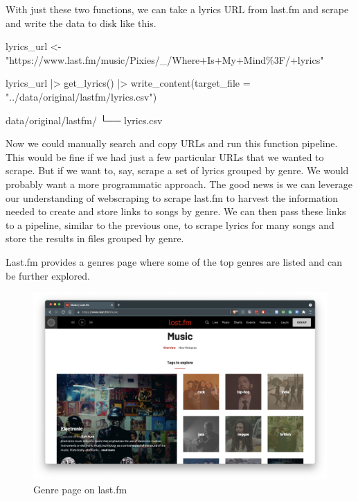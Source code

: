 \documentclass[
  letterpaper,
]{scrbook}
\newenvironment{Shaded}{\begin{snugshade}}{\end{snugshade}}
\newcommand{\AttributeTok}[1]{\textcolor[rgb]{0.00,0.00,0.00}{#1}}
\newcommand{\ExtensionTok}[1]{\textcolor[rgb]{0.00,0.00,0.00}{#1}}
\newcommand{\FunctionTok}[1]{\textcolor[rgb]{0.00,0.00,0.00}{#1}}
\newcommand{\NormalTok}[1]{\textcolor[rgb]{0.00,0.00,0.00}{#1}}
\newcommand{\OtherTok}[1]{\textcolor[rgb]{0.00,0.00,0.00}{#1}}
\newcommand{\SpecialCharTok}[1]{\textcolor[rgb]{0.00,0.00,0.00}{#1}}
\newcommand{\StringTok}[1]{\textcolor[rgb]{0.00,0.00,0.00}{#1}}
\begin{document}
With just these two functions, we can take a lyrics URL from last.fm and
scrape and write the data to disk like this.

\begin{Shaded}
\begin{Highlighting}[]
\NormalTok{lyrics\_url }\OtherTok{\textless{}{-}} \StringTok{"https://www.last.fm/music/Pixies/\_/Where+Is+My+Mind\%3F/+lyrics"}

\NormalTok{lyrics\_url }\SpecialCharTok{|\textgreater{}} 
  \FunctionTok{get\_lyrics}\NormalTok{() }\SpecialCharTok{|\textgreater{}} 
  \FunctionTok{write\_content}\NormalTok{(}\AttributeTok{target\_file =} \StringTok{"../data/original/lastfm/lyrics.csv"}\NormalTok{)}
\end{Highlighting}
\end{Shaded}

\begin{Shaded}
\begin{Highlighting}[]
\ExtensionTok{data/original/lastfm/}
\ExtensionTok{└──}\NormalTok{ lyrics.csv}
\end{Highlighting}
\end{Shaded}

Now we could manually search and copy URLs and run this function
pipeline. This would be fine if we had just a few particular URLs that
we wanted to scrape. But if we want to, say, scrape a set of lyrics
grouped by genre. We would probably want a more programmatic approach.
The good news is we can leverage our understanding of webscraping to
scrape last.fm to harvest the information needed to create and store
links to songs by genre. We can then pass these links to a pipeline,
similar to the previous one, to scrape lyrics for many songs and store
the results in files grouped by genre.

Last.fm provides a genres page where some of the top genres are listed
and can be further explored.

\begin{figure}[h]

{\centering \includegraphics[width=9.28in,height=\textheight]{./figures/acquire-data/ad-lastfm-genres.png}

}

\caption{\label{fig-ad-genre-page-lastfm}Genre page on last.fm}

\end{figure}
\end{document}
